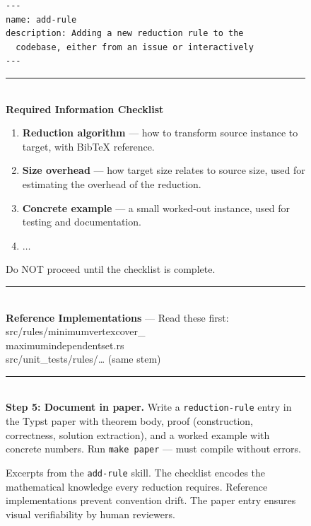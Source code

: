 \documentclass[conference]{IEEEtran}
\begin{document}
\begin{figure}[t]
  \centering
  \begin{tcolorbox}[
    colback=gray!5, colframe=gray!80,
    title={\textbf{\texttt{add-rule}} --- automation skill (excerpts)},
    fonttitle=\footnotesize, boxrule=0.4pt, arc=2pt, left=4pt, right=4pt, top=2pt, bottom=2pt
  ]
  \footnotesize
  \begin{lstlisting}[basicstyle=\ttfamily\footnotesize, numbers=none, frame=none, aboveskip=0pt, belowskip=0pt, xleftmargin=4pt]
---
name: add-rule
description: Adding a new reduction rule to the
  codebase, either from an issue or interactively
---
  \end{lstlisting}
  \vspace{-4pt}
  \rule{\linewidth}{0.3pt}\\[3pt]
  \textbf{Required Information Checklist}
  \begin{enumerate}
    \item \textbf{Reduction algorithm} --- how to transform source instance to target, with BibTeX reference.
    \item \textbf{Size overhead} --- how target size relates to source size, used for estimating the overhead of the reduction.
    \item \textbf{Concrete example} --- a small worked-out instance, used for testing and documentation.
    \item $\ldots$
  \end{enumerate}
  Do NOT proceed until the checklist is complete.\\[3pt]
  \rule{\linewidth}{0.3pt}\\[3pt]
  \textbf{Reference Implementations} --- Read these first:\\
  {\ttfamily src/rules/minimumvertexcover\_\\maximumindependentset.rs}\\
  {\ttfamily src/unit\_tests/rules/\ldots{} (same stem)}\\[3pt]
  \rule{\linewidth}{0.3pt}\\[3pt]
  \textbf{Step 5: Document in paper.}
  Write a \texttt{reduction-rule} entry in the Typst paper with theorem body, proof (construction, correctness, solution extraction), and a worked example with concrete numbers.
  Run \texttt{make paper} --- must compile without errors.
  \end{tcolorbox}
  \caption{Excerpts from the \texttt{add-rule} skill.
    The checklist encodes the mathematical knowledge every reduction requires.
    Reference implementations prevent convention drift.
    The paper entry ensures visual verifiability by human reviewers.}
  \label{fig:skill-addrule}
\end{figure}
\end{document}
